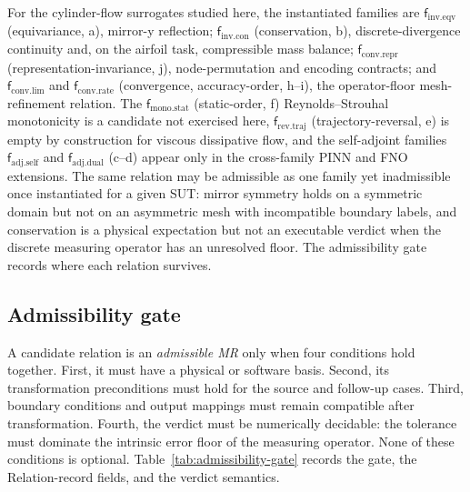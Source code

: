\documentclass[preprint,12pt,authoryear]{elsarticle}
\providecommand{\fIeqv}{\mathsf{f}_{\mathrm{inv}.\mathrm{eqv}}}
\providecommand{\fIcon}{\mathsf{f}_{\mathrm{inv}.\mathrm{con}}}
\providecommand{\fAself}{\mathsf{f}_{\mathrm{adj}.\mathrm{self}}}
\providecommand{\fAdual}{\mathsf{f}_{\mathrm{adj}.\mathrm{dual}}}
\providecommand{\fRtraj}{\mathsf{f}_{\mathrm{rev}.\mathrm{traj}}}
\providecommand{\fMstat}{\mathsf{f}_{\mathrm{mono}.\mathrm{stat}}}
\providecommand{\fClim}{\mathsf{f}_{\mathrm{conv}.\mathrm{lim}}}
\providecommand{\fCrate}{\mathsf{f}_{\mathrm{conv}.\mathrm{rate}}}
\providecommand{\fCrepr}{\mathsf{f}_{\mathrm{conv}.\mathrm{repr}}}
\begin{document}
For the cylinder-flow surrogates studied here, the instantiated families are $\fIeqv$ (equivariance, a), mirror-y reflection; $\fIcon$ (conservation, b), discrete-divergence continuity and, on the airfoil task, compressible mass balance; $\fCrepr$ (representation-invariance, j), node-permutation and encoding contracts; and $\fClim$ and $\fCrate$ (convergence, accuracy-order, h--i), the operator-floor mesh-refinement relation. The $\fMstat$ (static-order, f) Reynolds--Strouhal monotonicity is a candidate not exercised here, $\fRtraj$ (trajectory-reversal, e) is empty by construction for viscous dissipative flow, and the self-adjoint families $\fAself$ and $\fAdual$ (c--d) appear only in the cross-family PINN and FNO extensions. The same relation may be admissible as one family yet inadmissible once instantiated for a given SUT: mirror symmetry holds on a symmetric domain but not on an asymmetric mesh with incompatible boundary labels, and conservation is a physical expectation but not an executable verdict when the discrete measuring operator has an unresolved floor. The admissibility gate records where each relation survives.

\subsection{Admissibility gate}
\label{subsec:admissibility-gate}

A candidate relation is an \emph{admissible MR} only when four conditions hold together. First, it must have a physical or software basis. Second, its transformation preconditions must hold for the source and follow-up cases. Third, boundary conditions and output mappings must remain compatible after transformation. Fourth, the verdict must be numerically decidable: the tolerance must dominate the intrinsic error floor of the measuring operator. None of these conditions is optional. Table~\ref{tab:admissibility-gate} records the gate, the Relation-record fields, and the verdict semantics.
\end{document}
